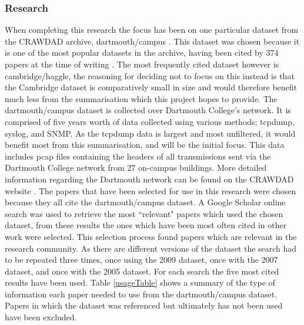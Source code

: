 \subsubsection{Research}

When completing this research the focus has been on one particular dataset from the CRAWDAD archive, dartmouth/campus \cite{dartmouthcampus2009}. This dataset was chosen because it is one of the most popular datasets in the archive, having been cited by 374 papers at the time of writing \cite{aboutCrawdad2014}. The most frequently cited dataset however is cambridge/haggle, the reasoning for deciding not to focus on this instead is that the Cambridge dataset is comparatively small in size and would therefore benefit much less from the summarisation which this project hopes to provide.
\newline
The dartmouth/campus dataset is collected over Dartmouth College's network. It is comprised of five years worth of data collected using various methods; tcpdump, syslog, and SNMP. As the tcpdump data is largest and most unfiltered, it would benefit most from this summarisation, and will be the initial focus. This data includes pcap files containing the headers of all transmissions sent via the Dartmouth College network from 27 on-campus buildings. More detailed information regarding the Dartmouth network can be found on the CRAWDAD website \cite{dartmouthcampus2009}.
\newline
The papers that have been selected for use in this research were chosen because they all cite the dartmouth/campus dataset. A Google Scholar \cite{googleScholar} online search was used to retrieve the most ``relevant" papers which used the chosen dataset, from these results the ones which have been most often cited in other work were selected. This selection process found papers which are relevant in the research community. As there are different versions of the dataset the search had to be repeated three times, once using the 2009 dataset, once with the 2007 dataset, and once with the 2005 dataset. For each search the five most cited results have been used. Table \ref{usageTable} shows a summary of the type of information each paper needed to use from the dartmouth/campus dataset. Papers in which the dataset was referenced but ultimately has not been used have been excluded.



